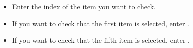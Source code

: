\begin{itemize}
\item Enter the index of the item you want to check.
\item If you want to check that the first item is selected, enter .
\item If you want to check that the fifth item is selected, enter .
   \end{itemize}
